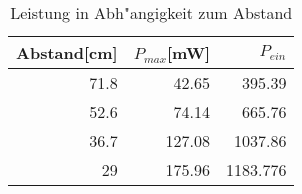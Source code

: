 \begin{table}[h]	
\centering
\begin{tabular}{|r||r||r|} \hline
Abstand[cm]	&	$P_{max}$[mW] & $P_{ein}$\\ \hline
71.8	&	42.65	&	395.39\\
52.6	&	74.14	&	665.76\\
36.7	&	127.08	&	1037.86\\
29		&	175.96 	&	1183.776
\end{tabular}
\caption{Leistung in Abh"angigkeit zum Abstand}
\label{tabelle_max}
\end{table}